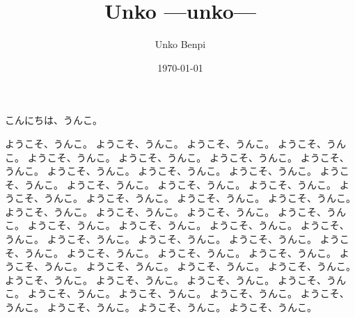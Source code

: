 \documentclass{ltjsarticle}
\author{Unko Benpi}
\date{\today}
\title{Unko ---unko---}
\begin{document}
\maketitle
    こんにちは、うんこ。

    ようこそ、うんこ。
    ようこそ、うんこ。
    ようこそ、うんこ。
    ようこそ、うんこ。
    ようこそ、うんこ。
    ようこそ、うんこ。
    ようこそ、うんこ。
    ようこそ、うんこ。
    ようこそ、うんこ。
    ようこそ、うんこ。
    ようこそ、うんこ。
    ようこそ、うんこ。
    ようこそ、うんこ。
    ようこそ、うんこ。
    ようこそ、うんこ。
    ようこそ、うんこ。
    ようこそ、うんこ。
    ようこそ、うんこ。
    ようこそ、うんこ。
    ようこそ、うんこ。
    ようこそ、うんこ。
    ようこそ、うんこ。
    ようこそ、うんこ。
    ようこそ、うんこ。
    ようこそ、うんこ。
    ようこそ、うんこ。
    ようこそ、うんこ。
    ようこそ、うんこ。
    ようこそ、うんこ。
    ようこそ、うんこ。
    ようこそ、うんこ。
    ようこそ、うんこ。
    ようこそ、うんこ。
    ようこそ、うんこ。
    ようこそ、うんこ。
    ようこそ、うんこ。
    ようこそ、うんこ。
    ようこそ、うんこ。
    ようこそ、うんこ。
    ようこそ、うんこ。
    ようこそ、うんこ。
    ようこそ、うんこ。
    ようこそ、うんこ。
    ようこそ、うんこ。
    ようこそ、うんこ。
    ようこそ、うんこ。
    ようこそ、うんこ。
    ようこそ、うんこ。
    ようこそ、うんこ。
\end{document}
